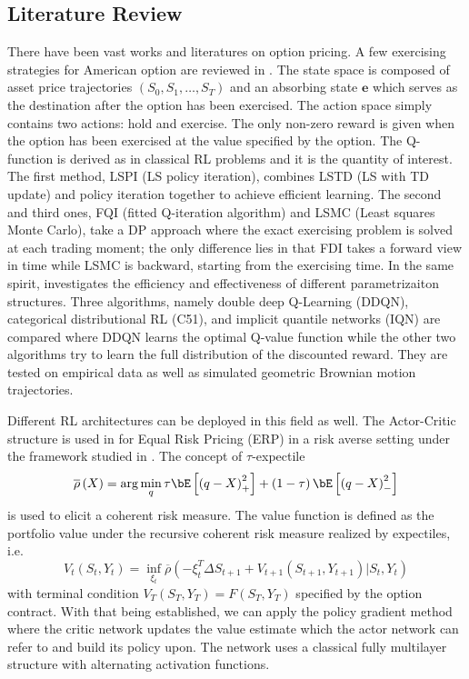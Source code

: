 \subsection{Literature Review}

There have been vast works and literatures on option pricing. A few
exercising strategies for American option are reviewed in \cite{li2009learning}.
The state space is composed of asset price trajectories $\left(S_{0},S_{1},\dots,S_{T}\right)$
and an absorbing state $\boldsymbol{e}$ which serves as the destination
after the option has been exercised. The action space simply contains
two actions: hold and exercise. The only non-zero reward is given
when the option has been exercised at the value specified by the option.
The Q-function is derived as in classical RL problems and it is the
quantity of interest. The first method, LSPI (LS policy iteration),
combines LSTD (LS with TD update) and policy iteration together to
achieve efficient learning. The second and third ones, FQI (fitted
Q-iteration algorithm) and LSMC (Least squares Monte Carlo), take
a DP approach where the exact exercising problem is solved at each
trading moment; the only difference lies in that FDI takes a forward
view in time while LSMC is backward, starting from the exercising
time. In the same spirit, \cite{fathan2021deep} investigates the
efficiency and effectiveness of different parametrizaiton structures.
Three algorithms, namely double deep Q-Learning (DDQN), categorical
distributional RL (C51), and implicit quantile networks (IQN) are
compared where DDQN learns the optimal Q-value function while the
other two algorithms try to learn the full distribution of the discounted
reward. They are tested on empirical data as well as simulated geometric
Brownian motion trajectories.

Different RL architectures can be deployed in this field as well.
The Actor-Critic structure is used in \cite{marzban2021deep} for
Equal Risk Pricing (ERP) in a risk averse setting under the framework
studied in \cite{tamar2015policy}. The concept of $\tau$-expectile
\[
\overline{\rho}\left(X\right)=\arg\min_{q}\tau\bE\left[\left(q-X\right)_{+}^{2}\right]+\left(1-\tau\right)\bE\left[\left(q-X\right)_{-}^{2}\right]
\]
is used to elicit a coherent risk measure. The value function is defined
as the portfolio value under the recursive coherent risk measure realized
by expectiles, i.e.
\[
V_{t}\left(S_{t},Y_{t}\right)=\inf_{\xi_{t}}\overline{\rho}\left(-\xi_{t}^{T}\Delta S_{t+1}+V_{t+1}\left(S_{t+1},Y_{t+1}\right)|S_{t},Y_{t}\right)
\]
with terminal condition $V_{T}\left(S_{T},Y_{T}\right)=F\left(S_{T},Y_{T}\right)$
specified by the option contract. With that being established, we
can apply the policy gradient method where the critic network updates
the value estimate which the actor network can refer to and build
its policy upon. The network uses a classical fully multilayer structure
with alternating activation functions.

